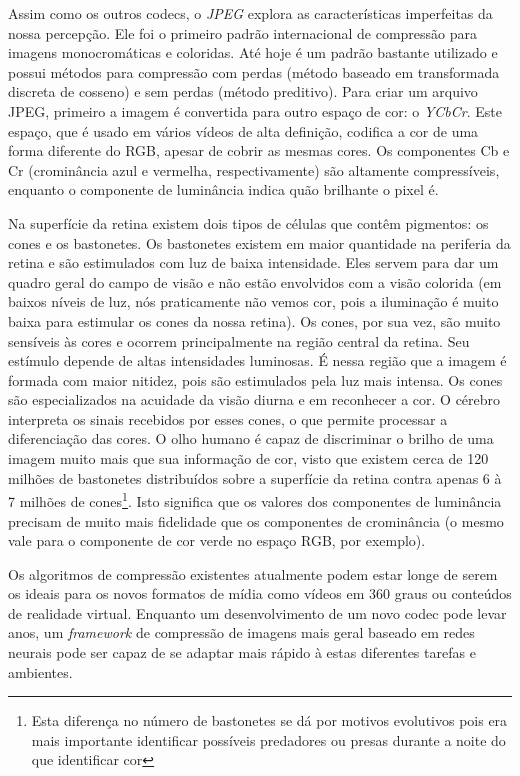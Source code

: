 Assim como os outros codecs, o \textit{JPEG} explora as características imperfeitas da nossa percepção. Ele foi o primeiro padrão internacional de compressão para imagens monocromáticas e coloridas. Até hoje é um padrão bastante utilizado e possui métodos para compressão com perdas (método baseado em transformada discreta de cosseno) e sem perdas (método preditivo). Para criar um arquivo JPEG, primeiro a imagem é convertida para outro espaço de cor: o \textit{YCbCr}. Este espaço, que é usado em vários vídeos de alta definição, codifica a cor de uma forma diferente do RGB, apesar de cobrir as mesmas cores. Os componentes Cb e Cr (crominância azul e vermelha, respectivamente) são altamente compressíveis, enquanto o componente de luminância indica quão brilhante o pixel é. 

Na superfície da retina existem dois tipos de células que contêm pigmentos: os cones e os bastonetes. Os bastonetes existem em maior quantidade na periferia da retina e são estimulados com luz de baixa intensidade. Eles servem para dar um quadro geral do campo de visão e não estão envolvidos com a visão colorida (em baixos níveis de luz, nós praticamente não vemos cor, pois a iluminação é muito baixa para estimular os cones da nossa retina). Os cones, por sua vez, são muito sensíveis às cores e ocorrem principalmente na região central da retina. Seu estímulo depende de altas intensidades luminosas. É nessa região que a imagem é formada com maior nitidez, pois são estimulados pela luz mais intensa. Os cones são especializados na acuidade da visão diurna e em reconhecer a cor. O cérebro interpreta os sinais recebidos por esses cones, o que permite processar a diferenciação das cores. O olho humano é capaz de discriminar o brilho de uma imagem muito mais que sua informação de cor, visto que existem cerca de 120 milhões de bastonetes distribuídos sobre a superfície da retina contra apenas 6 à 7 milhões de cones\footnote{Esta diferença no número de bastonetes se dá por motivos evolutivos pois era mais importante identificar possíveis predadores ou presas durante a noite do que identificar cor}. Isto significa que os valores dos componentes de luminância precisam de muito mais fidelidade que os componentes de crominância (o mesmo vale para o componente de cor verde no espaço RGB, por exemplo).

Os algoritmos de compressão existentes atualmente podem estar longe de serem os ideais para os novos formatos de mídia como vídeos em 360 graus ou conteúdos de realidade virtual. Enquanto um desenvolvimento de um novo codec pode levar anos, um \textit{framework} de compressão de imagens mais geral baseado em redes neurais pode ser capaz de se adaptar mais rápido à estas diferentes tarefas e ambientes.

